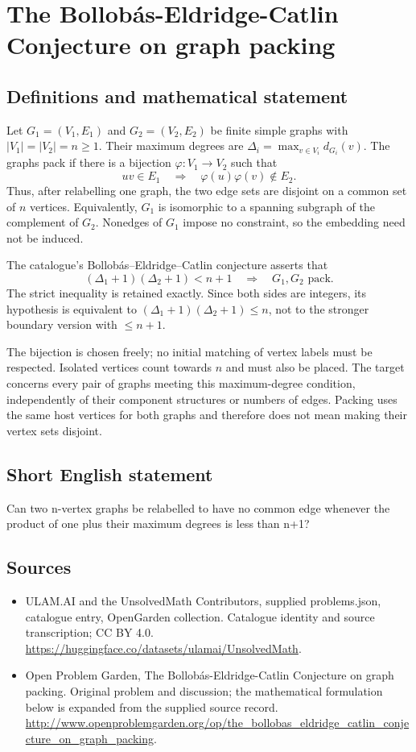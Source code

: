 \documentclass[11pt,a4paper]{article}
\begin{document}
\section*{The Bollobás-Eldridge-Catlin Conjecture on graph packing}\label{statement}

\subsection{Definitions and mathematical statement}
Let $G_1=(V_1,E_1)$ and $G_2=(V_2,E_2)$ be finite simple graphs with
$|V_1|=|V_2|=n\ge1$. Their maximum degrees are
$\Delta_i=\max_{v\in V_i}d_{G_i}(v)$. The graphs pack if there is a
bijection $\varphi:V_1\to V_2$ such that
\[
                  uv\in E_1\quad\Longrightarrow\quad
                  \varphi(u)\varphi(v)\notin E_2.
\]
Thus, after relabelling one graph, the two edge sets are disjoint on
a common set of $n$ vertices. Equivalently, $G_1$ is isomorphic to a
spanning subgraph of the complement of $G_2$. Nonedges of $G_1$ impose
no constraint, so the embedding need not be induced.

The catalogue's Bollobás--Eldridge--Catlin conjecture asserts that
\[
                       (\Delta_1+1)(\Delta_2+1)<n+1
              \quad\Longrightarrow\quad G_1,G_2\text{ pack}.
\]
The strict inequality is retained exactly. Since both sides are
integers, its hypothesis is equivalent to
$(\Delta_1+1)(\Delta_2+1)\le n$, not to the stronger boundary version
with $\le n+1$.

The bijection is chosen freely; no initial matching of vertex labels
must be respected. Isolated vertices count towards $n$ and must also
be placed. The target concerns every pair of graphs meeting this
maximum-degree condition, independently of their component structures
or numbers of edges. Packing uses the same host vertices for both
graphs and therefore does not mean making their vertex sets disjoint.
\subsection{Short English statement}
Can two n-vertex graphs be relabelled to have no common edge whenever the product of one plus their maximum degrees is less than n+1?
\subsection{Sources}
\begin{itemize}
\item[S1] ULAM.AI and the UnsolvedMath Contributors, supplied problems.json, catalogue entry, OpenGarden collection. Catalogue identity and source transcription; CC BY 4.0.
\url{https://huggingface.co/datasets/ulamai/UnsolvedMath}.
\item[S2] Open Problem Garden, The Bollobás-Eldridge-Catlin Conjecture on graph packing. Original problem and discussion; the mathematical formulation below is expanded from the supplied source record.
\url{http://www.openproblemgarden.org/op/the_bollobas_eldridge_catlin_conjecture_on_graph_packing}.
\end{itemize}
\end{document}
